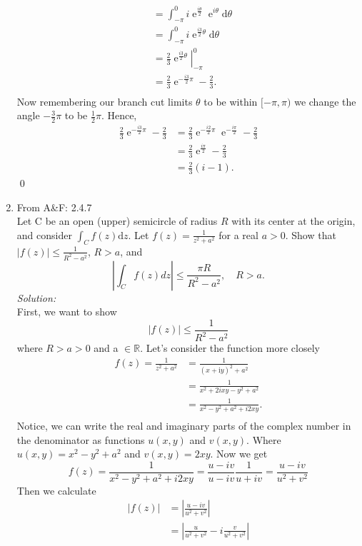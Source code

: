 \documentclass[10pt]{amsart}
\newcommand{\D}{\mathrm{d}}
\newcommand{\I}{\mathrm{i}}
\DeclareMathOperator{\E}{e}
\theoremstyle{nonumberplain}
\begin{document}
\begin{enumerate}[label={\bf {\arabic*}:}]
\begin{align*}
	&= \int_{-\pi}^{0} i\E^{\frac{i\theta}{2}} \E^{i\theta} \D \theta \\
	&= \int_{-\pi}^{0} i\E^{\frac{i3}{2}\theta} \D \theta \\
	&= \left. \frac 2 3 \E^{\frac{i3}{2}\theta} \right|_{-\pi}^{0} \\
	&= \frac 2 3 \E^{ - \frac{i3}{2} \pi} - \frac 2 3. \\
\end{align*}
Now remembering our branch cut limits $\theta$ to be within $[-\pi, \pi)$ we change the angle $-\frac 3 2 \pi$ to be $\frac 1 2 \pi$.
Hence,
\begin{align*}
\frac 2 3 \E^{ - \frac{i3}{2} \pi} - \frac 2 3 &= \frac 2 3 \E^{ - \frac{i2}{2} \pi} \E^{ - \frac{i\pi}{2}} - \frac 2 3 \\
	&= \frac 2 3 \E^{ \frac{i\pi}{2}} - \frac 2 3 \\
	&= \frac 2 3 \left( i - 1\right).
\end{align*}
\qed
\\
\item From A\&F: 2.4.7 \\
Let C be an open (upper) semicircle of radius $R$ with its center at the origin, and consider $\int_C f(z) \D z$.
 Let $f(z) = \frac{1}{z^2 + a^2}$ for a real $a > 0$.
Show that $\left| f(z) \right| \leq \frac{1}{R^2 - a^2}$, $R > a$, and
$$
\left| \int_C f(z) dz \right| \leq \frac{\pi R}{R^2 - a^2}, \quad R > a.
$$
\textit{Solution:} \\
First, we want to show
$$
\left| f(z) \right| \leq \frac{1}{R^2 - a^2}
$$
where $R > a > 0$ and a $\in \mathbb R$.
Let's consider the function more closely
\begin{align*}
f(z) =  \frac{1}{z^2 + a^2} &= \frac{1}{(x + \I y)^2 + a^2} \\
	&= \frac{1}{x^2 + 2ixy - y^2 + a^2} \\
	&= \frac{1}{x^2 - y^2 + a^2 + i2xy }. \\
\end{align*}
Notice, we can write the real and imaginary parts of the complex number in the denominator as functions $u(x, y)$ and $v(x, y)$.
Where $u(x, y) = x^2 - y^2 + a^2$ and $v(x, y) = 2xy$.
Now we get 
$$
f(z) = \frac{1}{x^2 - y^2 + a^2 + i2xy }	 = \frac{u - iv }{u - iv }\frac{1}{u + iv } = \frac{u - iv }{u^2 + v^2 }
$$
Then we calculate
\begin{align*}
\left| f(z) \right| &= \left| \frac{u - iv }{u^2 + v^2 } \right| \\
	&= \left| \frac{u }{u^2 + v^2 } - i\frac{v}{u^2 + v^2 } \right| \\

\end{align*}
\end{enumerate}
\end{document}

